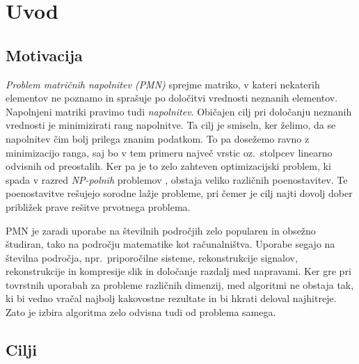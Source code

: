 \chapter{Uvod}
\section{Motivacija}
\textit{Problem matričnih napolnitev (PMN)} sprejme matriko, v kateri nekaterih elementov ne poznamo in sprašuje po določitvi vrednosti neznanih elementov. Napolnjeni matriki pravimo tudi \textit{napolnitev}. Običajen cilj pri določanju neznanih vrednosti je minimizirati rang napolnitve.
Ta cilj je smiseln, ker želimo, da se napolnitev čim bolj prilega znanim podatkom. To pa dosežemo ravno z minimizacijo ranga, saj bo v tem primeru največ vrstic oz.\ stolpcev linearno odvisnih od preostalih.
Ker pa je to zelo zahteven optimizacijski problem, ki spada v razred \textit{NP-polnih} problemov \cite{Survey-NKS19},
obstaja veliko različnih poenostavitev.
Te poenostavitve rešujejo sorodne lažje probleme, pri čemer je cilj najti dovolj dober približek prave rešitve prvotnega problema. 

PMN je zaradi uporabe na številnih področjih zelo
popularen in obsežno študiran, tako na področju matematike kot računalništva.
Uporabe segajo na številna področja, npr.\ priporočilne sisteme, rekonstrukcije signalov, rekonstrukcije in kompresije slik 
 in določanje razdalj med napravami.
Ker gre pri tovrstnih uporabah za probleme različnih dimenzij, med algoritmi ne obstaja tak, ki bi vedno vračal najbolj kakovostne rezultate in bi hkrati deloval najhitreje. Zato je izbira algoritma zelo odvisna tudi od problema samega. 

\iffalse
\CG{Algoritme testiramo in primerjamo na problemih razreševanja neznanih pikslov v slikah. Videli bomo, da poznamo boljše algoritme, ki rešujejo ta problem. Ker pa potrebujemo za izračun napake nezašumljeno matriko, je ta vrsta podatkov primerna. Tudi literatura za namene testiranja uporablja slike ali pa naključno generirane podatke. Ker pa lahko slike tudi vizualno opazujemo, se v diplomskem delu osredotočamo na te.} 

V diplomi bomo predstavili par algoritmov, ki rešujejo omenjen problem ter pokazali in razložili njihove ideje. Algoritmi so bili izbrani glede na njihovo popularnost in priznanost v literaturi. Prav tako poskrbimo, da so algoritmi primerno različni in temeljijo na drugačnih principih.
\fi

\section{Cilji}

